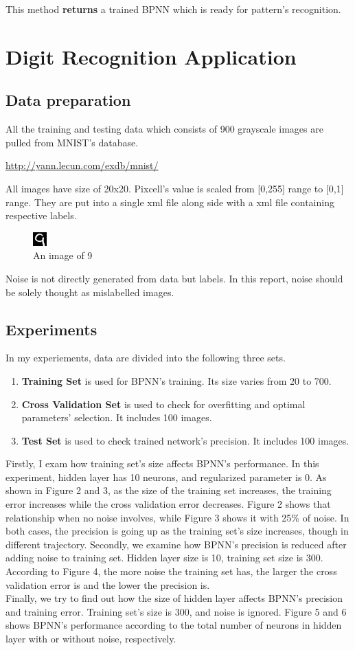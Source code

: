 \documentclass[a4paper, 11pt]{article}
\begin{document}
This method \textbf{returns} a trained BPNN which is ready for pattern's recognition.

\newpage
\section{Digit Recognition Application}
\subsection{Data preparation}
All the training and testing data which consists of 900 grayscale images are pulled from MNIST's database.
\begin{center}\url{http://yann.lecun.com/exdb/mnist/}\end{center}
All images have size of 20x20. Pixcell's value is scaled from [0,255] range to [0,1] range. They are put into a single xml file along side with a xml file containing respective labels.
\begin{figure}[ht]
  \centering
  \includegraphics[scale=5]{img0014}
  \caption{An image of 9}
  \label{fig:9}
\end{figure}
Noise is not directly generated from data but labels. In this report, noise should be solely thought as mislabelled images.
\subsection{Experiments}
In my experiements, data are divided into the following three sets.
\begin{enumerate}
\item \textbf{Training Set} is used for BPNN's training. Its size varies from 20 to 700.
\item \textbf{Cross Validation Set} is used to check for overfitting and optimal parameters' selection. It includes 100 images.
\item \textbf{Test Set} is used to check trained network's precision. It includes 100 images.
\end{enumerate}
Firstly, I exam how training set's size affects BPNN's performance. In this experiment, hidden layer has 10 neurons, and regularized parameter is 0. As shown in Figure 2 and 3, as the size of the training set increases, the training error increases while the cross validation error decreases. Figure 2 shows that relationship when no noise involves, while Figure 3 shows it with 25\% of noise. In both cases, the precision is going up as the training set's size increases, though in different trajectory.
Secondly, we examine how BPNN's precision is reduced after adding noise to training set. Hidden layer size is 10, training set size is 300. According to Figure 4, the more noise the training set has, the larger the cross validation error is and the lower the precision is. \\
Finally, we try to find out how the size of hidden layer affects BPNN's precision and training error. Training set's size is 300, and noise is ignored. Figure 5 and 6 shows BPNN's performance according to the total number of neurons in hidden layer with or without noise, respectively.
\end{document}
